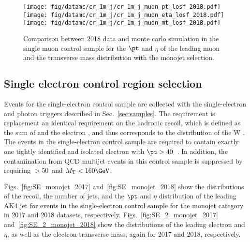 {\begin{figure}[htbp]
    \begin{center}
        \texttt{[image: fig/datamc/cr\_1m\_j/cr\_1m\_j\_muon\_pt\_losf\_2018.pdf]}
        \texttt{[image: fig/datamc/cr\_1m\_j/cr\_1m\_j\_muon\_eta\_losf\_2018.pdf]} \\
        \texttt{[image: fig/datamc/cr\_1m\_j/cr\_1m\_j\_muon\_mt\_losf\_2018.pdf]}
    \end{center}
    \caption{Comparison between 2018 data and monte carlo simulation in the single muon control sample for
        the $\pt$ and $\eta$ of the leading muon and the transverse mass distribution with the monojet selection.}
    \label{fig:SM_2_monojet_2018}
\end{figure}

\newpage

\subsection{Single electron control region selection}
\label{sec:selection_cr_1e}
Events for the single-electron control sample are collected with the single-electron and photon triggers described in Sec.~\ref{sec:samples}.  The \ptmiss requirement is replacement an identical requirement on the hadronic recoil, which is defined as the sum of \ptvecmiss and the electron \vpt, and thus corresponds to the distribution of the W \pt.
The events in the single-electron control sample are required to contain exactly one tightly identified and isolated electron with $\pt > 40$~\GeV.
In addition, the contamination from QCD multijet events in this control sample is suppressed by requiring \MET$ > 50$~\GeV and $\mt < 160 \GeV$.

Figs.~\ref{fig:SE_monojet_2017} and~\ref{fig:SE_monojet_2018} show the distributions of the recoil, the number of jets, and the $\pt$ and $\eta$ distribution of the leading AK4  jet
for events in the single-electron control sample for the monojet category in 2017 and 2018 datasets, respectively. Figs.~\ref{fig:SE_2_monojet_2017} and~\ref{fig:SE_2_monojet_2018} show the distributions of the leading electron \pt and $\eta$, as well as the electron-\ptmiss transverse mass, again for 2017 and 2018, respectively.

}
